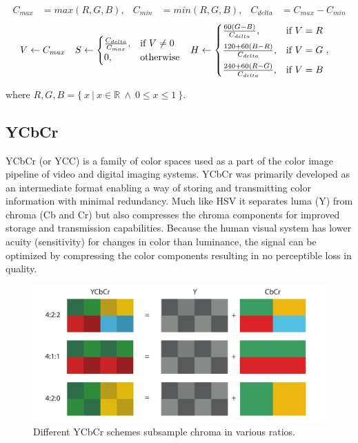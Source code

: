 \documentclass[thesis.tex]{subfiles}
\begin{document}
\begin{align*}
C_{max}&=max(R, G, B),	&	C_{min}&=min(R, G, B),	&	C_{delta}&=C_{max}-C_{min}
\end{align*}
\begin{align*}
V &\leftarrow C_{max}	&
S &\leftarrow
	\begin{cases}
		\frac{C_{delta}}{C_{max}}, & \text{if $V\neq0$}\\
		0, & \text{otherwise}
	\end{cases}			&
H &\leftarrow
	\begin{cases}
		\frac{60(G-B)}{C_{delta}}, & \text{if $V=R$}\vspace{2mm}\\
		\frac{120+60(B-R)}{C_{delta}}, & \text{if $V=G$}\vspace{2mm}\\
		\frac{240+60(R-G)}{C_{delta}}, & \text{if $V=B$}
	\end{cases},
\end{align*}

\noindent where $R, G, B = \{\ x\ \vert\ x \in \mathbb R\ \wedge\ 0 \leq x \leq 1\ \}$.

\subsection{YCbCr}
YCbCr (or YCC) is a family of color spaces used as a part of the color image pipeline of video and digital imaging systems. YCbCr was primarily developed as an intermediate format enabling a way of storing and transmitting color information with minimal redundancy. Much like HSV it separates luma (Y) from chroma (Cb and Cr) but also compresses the chroma components for improved storage and transmission capabilities. Because the human visual system has lower acuity (sensitivity) for changes in color than luminance, the signal can be optimized by compressing the color components resulting in no perceptible loss in quality. \cite{color_vision}

\begin{figure}[ht]
\centering \includegraphics[width=\textwidth]{images/ycbcr}
\caption{Different YCbCr schemes subsample chroma in various ratios.\label{figure:ycbcr}}
\end{figure}
\end{document}
